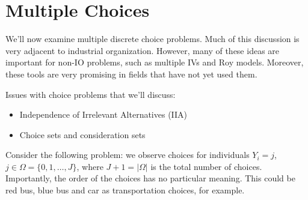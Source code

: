 \documentclass{tufte-handout}
\theoremstyle{break}
\begin{document}


\section{Multiple Choices}
 We'll now examine multiple discrete choice problems. Much of this discussion is very adjacent to industrial organization. However, many of these ideas are important for non-IO problems, such as multiple IVs and Roy models. Moreover, these tools are very promising in fields that  have not yet used them.
 
 Issues with choice problems that we'll discuss:
\begin{itemize}
\item Independence of Irrelevant Alternatives (IIA)
\item Choice sets and consideration sets
\end{itemize}
      
Consider the following problem: we observe choices for individuals $Y_{i} = j$, $j \in \Omega = \{0, 1, \ldots, J\}$, where $J+1 = |\Omega|$ is the total number of choices.  Importantly, the order of the choices has no particular meaning. This could be red bus, blue bus and car as transportation choices, for example. 
\end{document}

